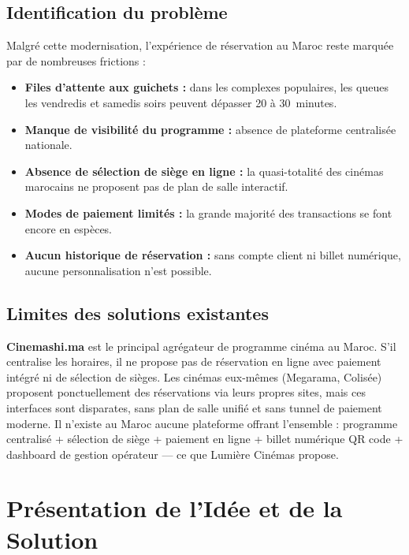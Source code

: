 \documentclass[12pt,a4paper,openany]{report}
\begin{document}
\subsection{Identification du problème}

Malgré cette modernisation, l'expérience de réservation au Maroc reste marquée par de nombreuses frictions :

\begin{itemize}
  \item \textbf{Files d'attente aux guichets :} dans les complexes populaires, les queues les vendredis et samedis soirs peuvent dépasser 20 à 30~minutes.
  \item \textbf{Manque de visibilité du programme :} absence de plateforme centralisée nationale.
  \item \textbf{Absence de sélection de siège en ligne :} la quasi-totalité des cinémas marocains ne proposent pas de plan de salle interactif.
  \item \textbf{Modes de paiement limités :} la grande majorité des transactions se font encore en espèces.
  \item \textbf{Aucun historique de réservation :} sans compte client ni billet numérique, aucune personnalisation n'est possible.
\end{itemize}

\subsection{Limites des solutions existantes}

\textbf{Cinemashi.ma} est le principal agrégateur de programme cinéma au Maroc. S'il centralise les horaires, il ne propose pas de réservation en ligne avec paiement intégré ni de sélection de sièges. Les cinémas eux-mêmes (Megarama, Colisée) proposent ponctuellement des réservations via leurs propres sites, mais ces interfaces sont disparates, sans plan de salle unifié et sans tunnel de paiement moderne. Il n'existe au Maroc aucune plateforme offrant l'ensemble : programme centralisé + sélection de siège + paiement en ligne + billet numérique QR code + dashboard de gestion opérateur — ce que Lumière Cinémas propose.

\section{Présentation de l'Idée et de la Solution}
\end{document}
